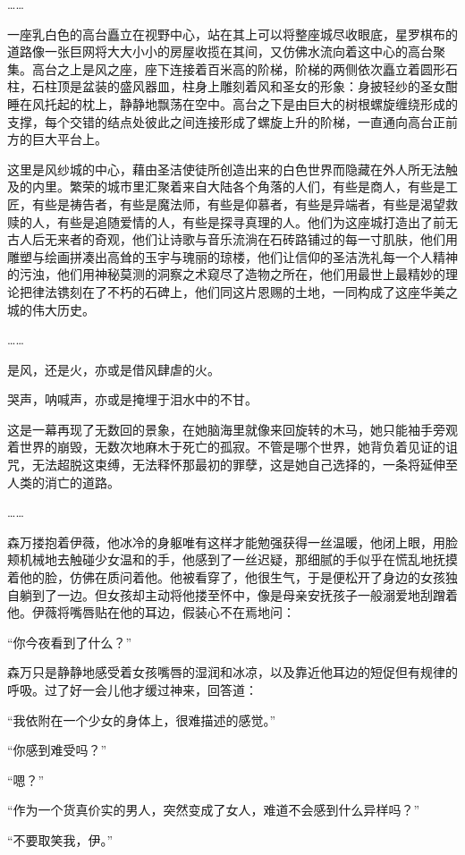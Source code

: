 ……

一座乳白色的高台矗立在视野中心，站在其上可以将整座城尽收眼底，星罗棋布的道路像一张巨网将大大小小的房屋收揽在其间，又仿佛水流向着这中心的高台聚集。高台之上是风之座，座下连接着百米高的阶梯，阶梯的两侧依次矗立着圆形石柱，石柱顶是盆装的盛风器皿，柱身上雕刻着风和圣女的形象：身披轻纱的圣女酣睡在风托起的枕上，静静地飘荡在空中。高台之下是由巨大的树根螺旋缠绕形成的支撑，每个交错的结点处彼此之间连接形成了螺旋上升的阶梯，一直通向高台正前方的巨大平台上。

这里是风纱城的中心，藉由圣洁使徒所创造出来的白色世界而隐藏在外人所无法触及的内里。繁荣的城市里汇聚着来自大陆各个角落的人们，有些是商人，有些是工匠，有些是祷告者，有些是魔法师，有些是仰慕者，有些是异端者，有些是渴望救赎的人，有些是追随爱情的人，有些是探寻真理的人。他们为这座城打造出了前无古人后无来者的奇观，他们让诗歌与音乐流淌在石砖路铺过的每一寸肌肤，他们用雕塑与绘画拼凑出高耸的玉宇与瑰丽的琼楼，他们让信仰的圣洁洗礼每一个人精神的污浊，他们用神秘莫测的洞察之术窥尽了造物之所在，他们用最世上最精妙的理论把律法镌刻在了不朽的石碑上，他们同这片恩赐的土地，一同构成了这座华美之城的伟大历史。

……

是风，还是火，亦或是借风肆虐的火。

哭声，呐喊声，亦或是掩埋于泪水中的不甘。

这是一幕再现了无数回的景象，在她脑海里就像来回旋转的木马，她只能袖手旁观着世界的崩毁，无数次地麻木于死亡的孤寂。不管是哪个世界，她背负着见证的诅咒，无法超脱这束缚，无法释怀那最初的罪孽，这是她自己选择的，一条将延伸至人类的消亡的道路。

……

森万搂抱着伊薇，他冰冷的身躯唯有这样才能勉强获得一丝温暖，他闭上眼，用脸颊机械地去触碰少女温和的手，他感到了一丝迟疑，那细腻的手似乎在慌乱地抚摸着他的脸，仿佛在质问着他。他被看穿了，他很生气，于是便松开了身边的女孩独自躺到了一边。但女孩却主动将他搂至怀中，像是母亲安抚孩子一般溺爱地刮蹭着他。伊薇将嘴唇贴在他的耳边，假装心不在焉地问：

“你今夜看到了什么？”

森万只是静静地感受着女孩嘴唇的湿润和冰凉，以及靠近他耳边的短促但有规律的呼吸。过了好一会儿他才缓过神来，回答道：

“我依附在一个少女的身体上，很难描述的感觉。”

“你感到难受吗？”

“嗯？”

“作为一个货真价实的男人，突然变成了女人，难道不会感到什么异样吗？”

“不要取笑我，伊。”

